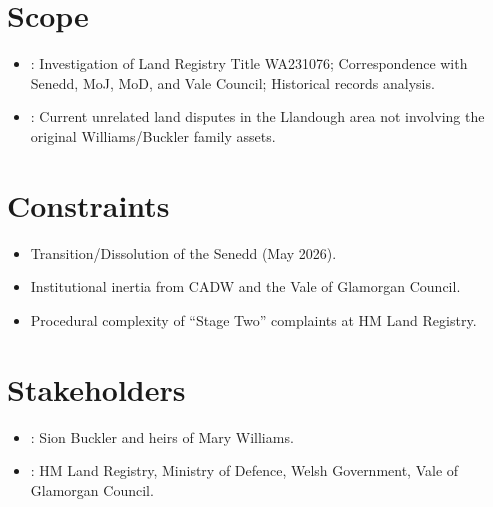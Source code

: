 \documentclass[letterpaper,10pt,openany,oneside,english]{sphinxmanual}
\begin{document}
\section{Scope}
\label{\detokenize{mandate:scope}}\begin{itemize}
\item {} 
\sphinxAtStartPar
{}: Investigation of Land Registry Title WA231076; Correspondence with Senedd, MoJ, MoD, and Vale Council; Historical records analysis.

\item {} 
\sphinxAtStartPar
{}: Current unrelated land disputes in the Llandough area not involving the original Williams/Buckler family assets.

\end{itemize}


\section{Constraints}
\label{\detokenize{mandate:constraints}}\begin{itemize}
\item {} 
\sphinxAtStartPar
Transition/Dissolution of the Senedd (May 2026).

\item {} 
\sphinxAtStartPar
Institutional inertia from CADW and the Vale of Glamorgan Council.

\item {} 
\sphinxAtStartPar
Procedural complexity of “Stage Two” complaints at HM Land Registry.

\end{itemize}


\section{Stakeholders}
\label{\detokenize{mandate:stakeholders}}\begin{itemize}
\item {} 
\sphinxAtStartPar
{}: Sion Buckler and heirs of Mary Williams.

\item {} 
\sphinxAtStartPar
{}: HM Land Registry, Ministry of Defence, Welsh Government, Vale of Glamorgan Council.

\end{itemize}
\end{document}
